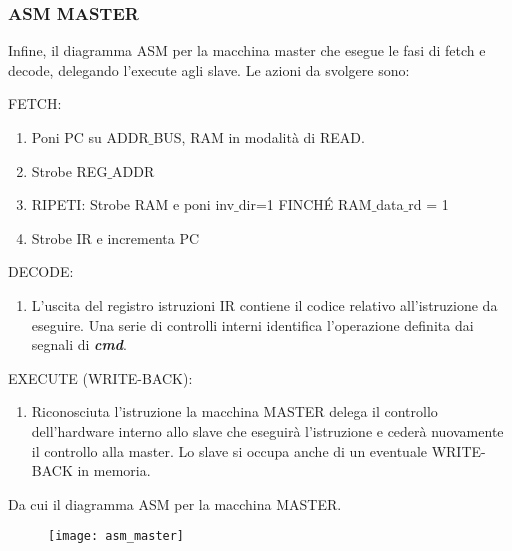 \newpage
\subsubsection{ASM MASTER}
Infine, il diagramma ASM per la macchina master che esegue le fasi di fetch e decode, delegando l'execute agli slave. Le azioni da svolgere sono:\\
\par \bigskip \noindent
FETCH:
\begin{enumerate}
	\item Poni PC su ADDR$\_$BUS, RAM in modalità di READ.
	\item Strobe REG$\_$ADDR
	\item RIPETI: Strobe RAM e poni inv$\_$dir=1 FINCHÉ RAM$\_$data$\_$rd = 1
	\item Strobe IR e incrementa PC
\end{enumerate}

\par \bigskip \noindent
DECODE:
\begin{enumerate}
	\item L'uscita del registro istruzioni IR contiene il codice relativo all'istruzione da eseguire. Una serie di controlli interni identifica l'operazione definita dai segnali di \textbf{\textit{cmd}}.
\end{enumerate}

\par \bigskip \noindent
EXECUTE (WRITE-BACK):
\begin{enumerate}
	\item Riconosciuta l'istruzione la macchina MASTER delega il controllo dell'hardware interno allo slave che eseguirà l'istruzione e cederà nuovamente il controllo alla master. Lo slave si occupa anche di un eventuale WRITE-BACK in memoria.
\end{enumerate}

\noindent
Da cui il diagramma ASM per la macchina MASTER.
\begin{figure}[H]
	\centering
	\texttt{[image: asm\_master]}
	\label{fig:asm_master}
\end{figure}

